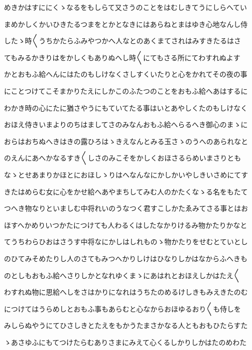 \documentclass[a4paper,11pt,landscape]{ltjtarticle}
\begin{document}
\par\medskip
めきかはすににくゝなるをもしらて又さうのことをはむしきてうにしらへてい
\par\medskip
まめかしくかいひきたるつまをとかとなきにはあらねとまはゆき心地なんし侍
\par\medskip
したゝ時〱うちかたらふみやつかへ人なとのあくまてされはみすきたるはさ
\par\medskip
てもみるかきりはをかしくもありぬへし時〱にてもさる所にてわすれぬよす
\par\medskip
かとおもふ給へんにはたのもしけなくさしすくいたりと心をかれてその夜の事
\par\medskip
にことつけてこそまかりたえにしかこのふたつのことをおもふ給へあはするに
\par\medskip
わかき時の心にたに猶さやうにもていてたる事はいとあやしくたのもしけなく
\par\medskip
おほえ侍きいまよりのちはましてさのみなんおもふ給へらるへき御心のまゝに
\par\medskip
おらはおちぬへきはきの露ひろはゝきえなんとみる玉さゝのうへのあられなと
\par\medskip
のえんにあへかなるすき〱しさのみこそをかしくおほさるらめいまさりとも
\par\medskip
なゝとせあまりかほとにおほしゝりはへなんなにかしかいやしきいさめにてす
\par\medskip
きたはめらむ女に心をかせ給へあやまちしてみむ人のかたくなゝる名をもたて
\par\medskip
つへき物なりといましむ中将れいのうなつく君すこしかたゑみてさる事とはお
\par\medskip
ほすへかめりいつかたにつけても人わるくはしたなかりけるみ物かたりかなと
\par\medskip
てうちわらひおはさうす中将なにかしはしれものゝ物かたりをせむとていとし
\par\medskip
のひてみそめたりし人のさてもみつへかりしけはひなりしかはなからふへきも
\par\medskip
のとしもおもふ給へさりしかとなれゆくまゝにあはれとおほえしかはたえ〱
\par\medskip
わすれぬ物に思給へしをさはかりになれはうちたのめるけしきもみえきたのむ
\par\medskip
につけてはうらめしとおもふ事もあらむと心なからおほゆるおり〱も侍しを
\par\medskip
みしらぬやうにてひさしきとたえをもかうたまさかなる人ともおもひたらすた
\par\medskip
ゝあさゆふにもてつけたらむありさまにみえて心くるしかりしかはたのめわた
\par\medskip
\end{document}
